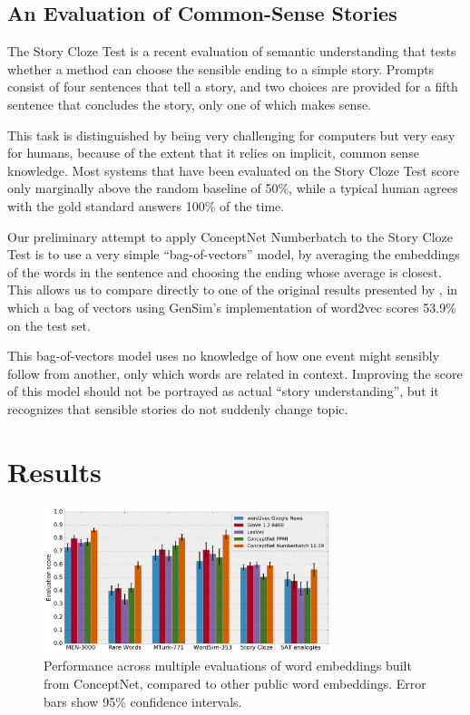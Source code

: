 \documentclass[letterpaper]{article}
\begin{document}
\subsection{An Evaluation of Common-Sense Stories}
\label{story-evaluation}

The Story Cloze Test \cite{mostafazadeh2016cloze} is a recent evaluation of
semantic understanding that tests whether a method can choose the sensible
ending to a simple story. Prompts consist of four sentences that tell a story,
and two choices are provided for a fifth sentence that concludes the story,
only one of which makes sense.

This task is distinguished by being very challenging for computers but very
easy for humans, because of the extent that it relies on implicit, common sense
knowledge. Most systems that have been evaluated on the Story Cloze Test
score only marginally above the random baseline of 50\%, while a typical
human agrees with the gold standard answers 100\% of the time.

Our preliminary attempt to apply ConceptNet Numberbatch to the Story Cloze Test
is to use a very simple ``bag-of-vectors'' model, by averaging the
embeddings of the words in the sentence and choosing the ending whose average is
closest. This allows us to compare directly to one of the original results presented by
\citeauthor{mostafazadeh2016cloze}, in which a bag of vectors using GenSim's
implementation of word2vec scores 53.9\% on the test set.

This bag-of-vectors model uses no knowledge of how one event might sensibly
follow from another, only which words are related in context. Improving the
score of this model should not be portrayed as actual ``story understanding'',
but it recognizes that sensible stories do not suddenly change topic.

\section{Results}
\begin{figure}[t]
\centering
\includegraphics[width=3.3in]{eval-graph.pdf}
\caption{
    Performance across multiple evaluations of word embeddings built from
    ConceptNet, compared to other public word embeddings. Error bars
    show 95\% confidence intervals.
}
\label{eval-results}
\end{figure}
\end{document}
